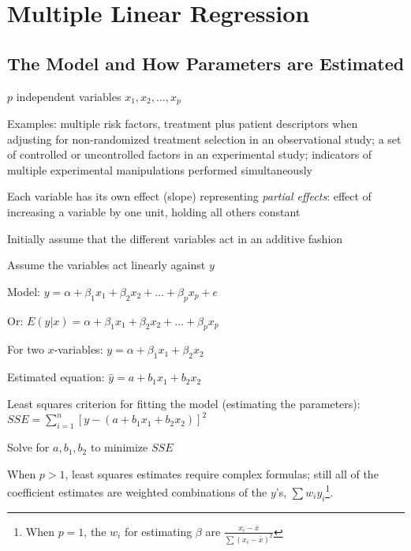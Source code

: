 \clearpage
\section{Multiple Linear Regression}
 
\subsection{The Model and How Parameters are Estimated}
\bi
\item $p$ independent variables $x_{1}, x_{2}, \ldots, x_{p}$
\item Examples: multiple risk factors, treatment
  plus patient descriptors when adjusting for non-randomized treatment
  selection in an observational study; a set of controlled or
  uncontrolled factors in an experimental study; indicators of
  multiple experimental manipulations performed simultaneously
\item Each variable has its own effect (slope) representing
  \emph{partial effects}: effect of increasing a variable by one unit,
  holding all others constant
\item Initially assume that the different variables act in an additive
  fashion
\item Assume the variables act linearly against $y$
\item Model: $y = \alpha + \beta_{1}x_{1} + \beta_{2}x_{2} + \ldots +
  \beta_{p}x_{p} + e$ \ipacue
\item Or: $E(y|x) = \alpha + \beta_{1}x_{1} + \beta_{2}x_{2} + \ldots +
  \beta_{p}x_{p}$
\item For two $x$-variables: $y = \alpha + \beta_{1}x_{1} + \beta_{2}x_{2}$
\item Estimated equation: $\hat{y} = a + b_{1}x_{1} + b_{2}x_{2}$
\item Least squares criterion for fitting the model (estimating the
  parameters): \\
  $SSE = \sum_{i=1}^{n} [y - (a + b_{1}x_{1} + b_{2}x_{2})]^2$
\item Solve for $a, b_{1}, b_{2}$ to minimize $SSE$
\item When $p>1$, least squares estimates require complex
formulas; still all of the coefficient estimates are weighted
combinations of the $y$'s, $\sum w_{i}y_{i}$\footnote{When $p=1$, the
  $w_i$ for estimating $\beta$ are
  $\frac{x_{i}-\bar{x}}{\sum(x_{i}-\bar{x})^{2}}$}.
\ei

